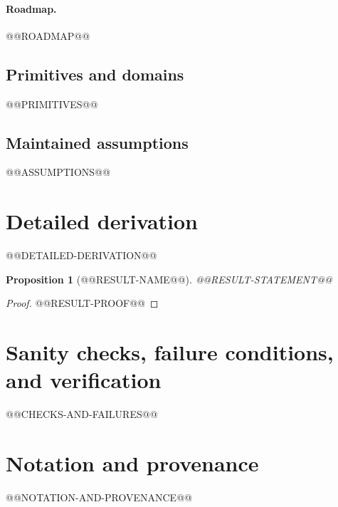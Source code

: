 \documentclass[11pt]{article}
\numberwithin{equation}{section}
\newtheorem{proposition}[theorem]{Proposition}
\theoremstyle{definition}
\theoremstyle{remark}
\begin{document}
\paragraph{Roadmap.}
@@ROADMAP@@

\subsection{Primitives and domains}
@@PRIMITIVES@@

\subsection{Maintained assumptions}
@@ASSUMPTIONS@@

\section{Detailed derivation}\label{app:derivation}
@@DETAILED-DERIVATION@@

\begin{proposition}[@@RESULT-NAME@@]\label{prop:main-result}
@@RESULT-STATEMENT@@
\end{proposition}

\begin{proof}
@@RESULT-PROOF@@
\end{proof}

\section{Sanity checks, failure conditions, and verification}\label{app:verification}
@@CHECKS-AND-FAILURES@@

\section{Notation and provenance}\label{app:notation}
@@NOTATION-AND-PROVENANCE@@
\end{document}
